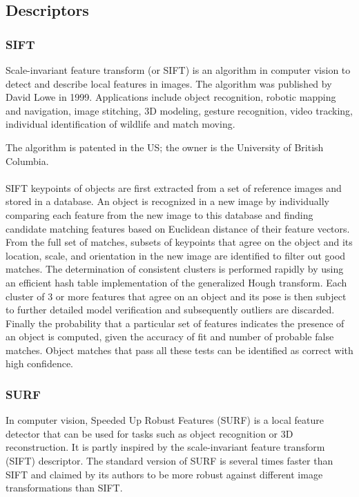 \documentclass[12pt]{article}
\begin{document}
\subsection{Descriptors}

\subsubsection{SIFT}
Scale-invariant feature transform (or SIFT) is an algorithm in computer vision to detect and describe local features in images. The algorithm was published by David Lowe in 1999.
Applications include object recognition, robotic mapping and navigation, image stitching, 3D modeling, gesture recognition, video tracking, individual identification of wildlife and match moving.

The algorithm is patented in the US; the owner is the University of British Columbia.
\paragraph{}
SIFT keypoints of objects are first extracted from a set of reference images and stored in a database. An object is recognized in a new image by individually comparing each feature from the new image to this database and finding candidate matching features based on Euclidean distance of their feature vectors. From the full set of matches, subsets of keypoints that agree on the object and its location, scale, and orientation in the new image are identified to filter out good matches. The determination of consistent clusters is performed rapidly by using an efficient hash table implementation of the generalized Hough transform. Each cluster of 3 or more features that agree on an object and its pose is then subject to further detailed model verification and subsequently outliers are discarded. Finally the probability that a particular set of features indicates the presence of an object is computed, given the accuracy of fit and number of probable false matches. Object matches that pass all these tests can be identified as correct with high confidence.


\subsubsection{SURF}

In computer vision, Speeded Up Robust Features (SURF) is a local feature detector that can be used for tasks such as object recognition or 3D reconstruction. It is partly inspired by the scale-invariant feature transform (SIFT) descriptor. The standard version of SURF is several times faster than SIFT and claimed by its authors to be more robust against different image transformations than SIFT.
\end{document}
